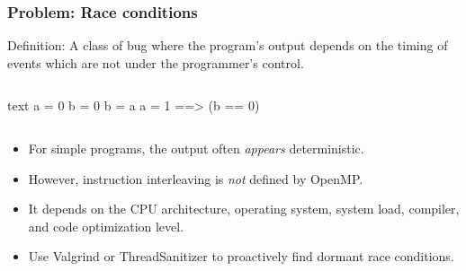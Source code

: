 \documentclass[]{beamer}
\begin{document}
\begin{frame}[fragile]
  \frametitle{Problem: Race conditions}
  Definition: A class of bug where the program's output depends on the timing of events which are not under the programmer's control.  
  \begin{columns}[t]%
    \begin{column}{0.5\textwidth}
      \begin{ccode}[]
        {text}
        a = 0
        b = 0
        b = a
        a = 1
          ==> (b == 0)\end{ccode}
    \end{column}
  \end{columns}
  \begin{itemize}
  \item For simple programs, the output often \emph{appears} deterministic.
  \item However, instruction interleaving is \emph{not} defined by OpenMP.
  \item It depends on the CPU architecture, operating system, system load, compiler, and code optimization level.
  \item Use Valgrind or ThreadSanitizer to proactively find dormant race conditions.
  \end{itemize}

\end{frame}
\end{document}
